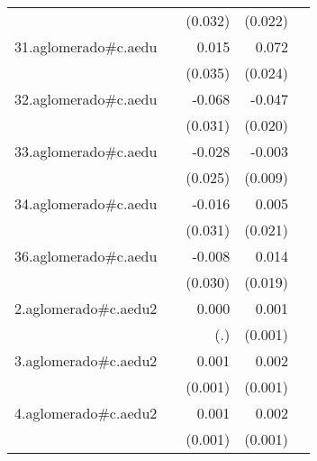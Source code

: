 {\begin{longtable}{l*{4}{D{.}{.}{-1}}}
            &                     &     (0.032)         &     (0.022)         &                     \\
\addlinespace
31.aglomerado#c.aedu&                     &       0.015         &       0.072\sym{**} &                     \\
            &                     &     (0.035)         &     (0.024)         &                     \\
\addlinespace
32.aglomerado#c.aedu&                     &      -0.068\sym{*}  &      -0.047\sym{*}  &                     \\
            &                     &     (0.031)         &     (0.020)         &                     \\
\addlinespace
33.aglomerado#c.aedu&                     &      -0.028         &      -0.003         &                     \\
            &                     &     (0.025)         &     (0.009)         &                     \\
\addlinespace
34.aglomerado#c.aedu&                     &      -0.016         &       0.005         &                     \\
            &                     &     (0.031)         &     (0.021)         &                     \\
\addlinespace
36.aglomerado#c.aedu&                     &      -0.008         &       0.014         &                     \\
            &                     &     (0.030)         &     (0.019)         &                     \\
\addlinespace
2.aglomerado#c.aedu2&                     &       0.000         &       0.001         &                     \\
            &                     &         (.)         &     (0.001)         &                     \\
\addlinespace
3.aglomerado#c.aedu2&                     &       0.001         &       0.002         &                     \\
            &                     &     (0.001)         &     (0.001)         &                     \\
\addlinespace
4.aglomerado#c.aedu2&                     &       0.001         &       0.002\sym{***}&                     \\
            &                     &     (0.001)         &     (0.001)         &                     \\

\end{longtable}}

